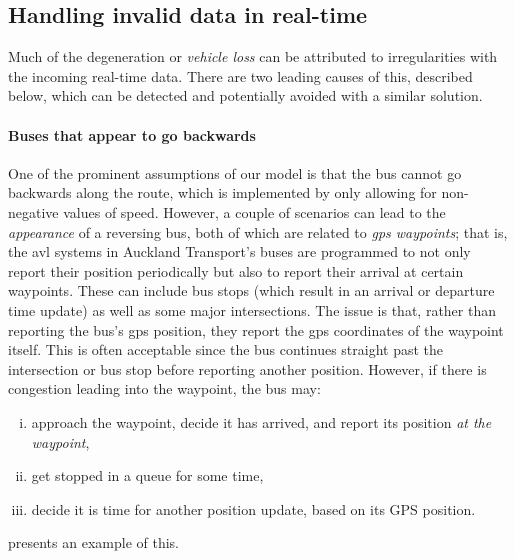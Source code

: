 \subsection{Handling invalid data in real-time}
\label{sec:data_issues}

Much of the degeneration or \emph{vehicle loss} can be attributed to irregularities with the incoming real-time data. There are two leading causes of this, described below, which can be detected and potentially avoided with a similar solution.


\paragraph{Buses that appear to go backwards}

One of the prominent assumptions of our model is that the bus cannot go backwards along the route, which is implemented by only allowing for non-negative values of speed. However, a couple of scenarios can lead to the \emph{appearance} of a reversing bus, both of which are related to \emph{\gls{gps} waypoints}; that is, the \gls{avl} systems in Auckland Transport's buses are programmed to not only report their position periodically but also to report their arrival at certain waypoints. These can include bus stops (which result in an arrival or departure time update) as well as some major intersections. The issue is that, rather than reporting the bus's \gls{gps} position, they report the \gls{gps} coordinates of the waypoint itself. This is often acceptable since the bus continues straight past the intersection or bus stop before reporting another position. However, if there is congestion leading into the waypoint, the bus may:
\begin{enumerate}[i.]
\item approach the waypoint, decide it has arrived, and report its position \emph{at the waypoint},
\item get stopped in a queue for some time,
\item decide it is time for another position update, based on its GPS position.
\end{enumerate}
 presents an example of this.

